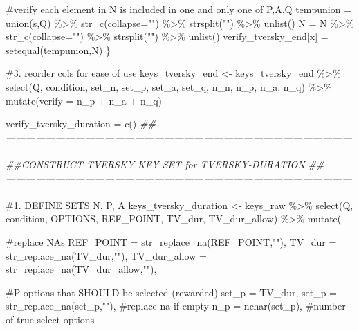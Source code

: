 \documentclass[
  letterpaper,
  DIV=11,
  numbers=noendperiod]{scrreprt}
\newenvironment{Shaded}{\begin{snugshade}}{\end{snugshade}}
\newcommand{\AttributeTok}[1]{\textcolor[rgb]{0.40,0.45,0.13}{#1}}
\newcommand{\CommentTok}[1]{\textcolor[rgb]{0.37,0.37,0.37}{#1}}
\newcommand{\DocumentationTok}[1]{\textcolor[rgb]{0.37,0.37,0.37}{\textit{#1}}}
\newcommand{\FunctionTok}[1]{\textcolor[rgb]{0.28,0.35,0.67}{#1}}
\newcommand{\NormalTok}[1]{\textcolor[rgb]{0.00,0.23,0.31}{#1}}
\newcommand{\OtherTok}[1]{\textcolor[rgb]{0.00,0.23,0.31}{#1}}
\newcommand{\SpecialCharTok}[1]{\textcolor[rgb]{0.37,0.37,0.37}{#1}}
\newcommand{\StringTok}[1]{\textcolor[rgb]{0.13,0.47,0.30}{#1}}
\begin{document}
\begin{Shaded}
\begin{Highlighting}[]
  \CommentTok{\#verify each element in N is included in one and only one of P,A,Q}
\NormalTok{  tempunion }\OtherTok{=} \FunctionTok{union}\NormalTok{(s,Q) }\SpecialCharTok{\%\textgreater{}\%} \FunctionTok{str\_c}\NormalTok{(}\AttributeTok{collapse=}\StringTok{""}\NormalTok{) }\SpecialCharTok{\%\textgreater{}\%} \FunctionTok{strsplit}\NormalTok{(}\StringTok{""}\NormalTok{) }\SpecialCharTok{\%\textgreater{}\%} \FunctionTok{unlist}\NormalTok{()}
\NormalTok{  N }\OtherTok{=}\NormalTok{ N }\SpecialCharTok{\%\textgreater{}\%} \FunctionTok{str\_c}\NormalTok{(}\AttributeTok{collapse=}\StringTok{""}\NormalTok{) }\SpecialCharTok{\%\textgreater{}\%} \FunctionTok{strsplit}\NormalTok{(}\StringTok{""}\NormalTok{) }\SpecialCharTok{\%\textgreater{}\%} \FunctionTok{unlist}\NormalTok{()}
\NormalTok{  verify\_tversky\_end[x] }\OtherTok{=} \FunctionTok{setequal}\NormalTok{(tempunion,N)}
\NormalTok{\}}

\CommentTok{\#3. reorder cols for ease of use}
\NormalTok{keys\_tversky\_end }\OtherTok{\textless{}{-}}\NormalTok{ keys\_tversky\_end }\SpecialCharTok{\%\textgreater{}\%} \FunctionTok{select}\NormalTok{(Q, condition, set\_n, set\_p, set\_a, set\_q, n\_n, n\_p, n\_a, n\_q) }\SpecialCharTok{\%\textgreater{}\%} \FunctionTok{mutate}\NormalTok{(}\AttributeTok{verify =}\NormalTok{ n\_p }\SpecialCharTok{+}\NormalTok{ n\_a }\SpecialCharTok{+}\NormalTok{ n\_q)}

\NormalTok{verify\_tversky\_duration }\OtherTok{=} \FunctionTok{c}\NormalTok{()}
\DocumentationTok{\#\#——————————————————————————————————————————————————————————————————————}
\DocumentationTok{\#\#CONSTRUCT TVERSKY KEY SET for TVERSKY{-}DURATION}
\DocumentationTok{\#\#——————————————————————————————————————————————————————————————————————}
\CommentTok{\#1. DEFINE SETS N, P, A}
\NormalTok{keys\_tversky\_duration }\OtherTok{\textless{}{-}}\NormalTok{ keys\_raw }\SpecialCharTok{\%\textgreater{}\%} 
  \FunctionTok{select}\NormalTok{(Q, condition, OPTIONS, REF\_POINT, TV\_dur, TV\_dur\_allow) }\SpecialCharTok{\%\textgreater{}\%} 
  \FunctionTok{mutate}\NormalTok{(}
  
    \CommentTok{\#replace NAs }
    \AttributeTok{REF\_POINT =} \FunctionTok{str\_replace\_na}\NormalTok{(REF\_POINT,}\StringTok{""}\NormalTok{),}
    \AttributeTok{TV\_dur =} \FunctionTok{str\_replace\_na}\NormalTok{(TV\_dur,}\StringTok{""}\NormalTok{),}
    \AttributeTok{TV\_dur\_allow =} \FunctionTok{str\_replace\_na}\NormalTok{(TV\_dur\_allow,}\StringTok{""}\NormalTok{),}
    
    \CommentTok{\#P options that SHOULD be selected (rewarded)}
    \AttributeTok{set\_p =}\NormalTok{ TV\_dur,}
    \AttributeTok{set\_p =} \FunctionTok{str\_replace\_na}\NormalTok{(set\_p,}\StringTok{""}\NormalTok{), }\CommentTok{\#replace na if empty}
    \AttributeTok{n\_p =} \FunctionTok{nchar}\NormalTok{(set\_p), }\CommentTok{\#number of true{-}select options}
    

\end{Highlighting}
\end{Shaded}
\end{document}
